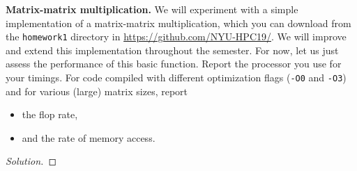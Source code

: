 \item {\bf Matrix-matrix multiplication.}  We will experiment with a simple
implementation of a matrix-matrix multiplication, which you can download from
the \texttt{homework1} directory in \url{https://github.com/NYU-HPC19/}. We will
improve and extend this implementation throughout the semester. For now, let us
just assess the performance of this basic function. Report the processor you use
for your timings. For code compiled with different optimization flags
(\texttt{-O0} and \texttt{-O3}) and for various (large) matrix sizes, report
\begin{itemize}
\item the flop rate,
\item and the rate of memory access.
\end{itemize}

\begin{proof}[Solution]



\end{proof}
